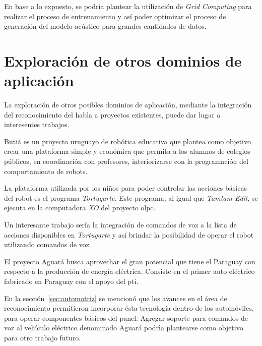 En base a lo expuesto, se podr\'ia plantear la utilizaci\'on de \emph{Grid Computing} para realizar el proceso de entrenamiento y as\'i
poder optimizar el proceso de generaci\'on del modelo ac\'ustico para grandes cantidades de datos.

\section{Exploraci\'on de otros dominios de aplicaci\'on}
La exploraci\'on de otros posibles dominios de aplicaci\'on, mediante la integraci\'on del reconocimiento del habla a proyectos existentes, puede dar lugar a interesentes trabajos.

Buti\'a es un proyecto uruguayo de rob\'otica educativa \cite{RoboticaEducativa} que plantea como objetivo 
crear una plataforma simple y econ\'omica que permita a los alumnos de colegios p\'ublicos,
en coordinaci\'on con profesores, interiorizarse con la programaci\'on del comportamiento de robots\cite{Butia}.

La plataforma utilizada por los ni\~nos para poder controlar las acciones b\'asicas del robot es el programa
\emph{Tortugarte}. Este programa, al igual que \emph{Tamtam Edit}, se ejecuta en la computadora \emph{XO} del
proyecto \gls{olpc}.

Un interesante trabajo ser\'ia la integraci\'on de comandos de voz a la lista de acciones disponibles 
en \emph{Tortugarte} y as\'i brindar la posibilidad de operar el robot utilizando comandos de voz.

El proyecto Aguar\'a busca aprovechar el gran potencial que tiene el Paraguay con respecto a la producci\'on de
energ\'ia el\'ectrica. Consiste en el primer auto el\'ectrico fabricado en Paraguay con el apoyo del \gls{pti}. 

En la secci\'on~\ref{sec:automotriz} se mencion\'o que los avances en el \'area de reconocimiento
permitieron incorporar \'esta tecnolog\'ia dentro de los autom\'oviles, para operar componentes b\'asicos del panel.
Agregar soporte para comandos de voz al veh\'iculo el\'ectrico denominado Aguar\'a podr{\'\i}a plantearse como objetivo
para otro trabajo futuro.
